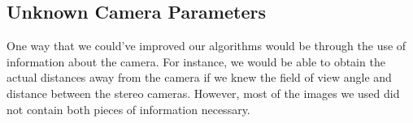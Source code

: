 \subsection{Unknown Camera Parameters}
One way that we could've improved our algorithms would be through the use of information about the camera. For instance, we would be able to obtain the actual distances away from the camera if we knew the field of view angle and distance between the stereo cameras. However, most of the images we used did not contain both pieces of information necessary. 
